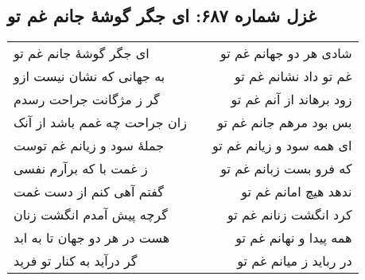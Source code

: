 \begin{center}
\section*{غزل شماره ۶۸۷: ای جگر گوشهٔ جانم غم تو}
\label{sec:687}
\begin{longtable}{l p{0.5cm} r}
ای جگر گوشهٔ جانم غم تو
&&
شادی هر دو جهانم غم تو
\\
به جهانی که نشان نیست ازو
&&
غم تو داد نشانم غم تو
\\
گر ز مژگانت جراحت رسدم
&&
زود برهاند از آنم غم تو
\\
زان جراحت چه غمم باشد از آنک
&&
بس بود مرهم جانم غم تو
\\
جملهٔ سود و زیانم غم توست
&&
ای همه سود و زیانم غم تو
\\
ز غمت با که برآرم نفسی
&&
که فرو بست زبانم غم تو
\\
گفتم آهی کنم از دست غمت
&&
ندهد هیچ امانم غم تو
\\
گرچه پیش آمدم انگشت زنان
&&
کرد انگشت زنانم غم تو
\\
هست در هر دو جهان تا به ابد
&&
همه پیدا و نهانم غم تو
\\
گر درآید به کنار تو فرید
&&
در رباید ز میانم غم تو
\\
\end{longtable}
\end{center}
